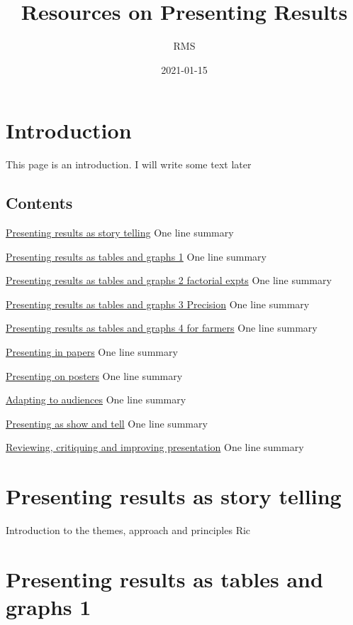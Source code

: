 \documentclass[
]{book}
\title{Resources on Presenting Results}
\author{RMS}
\date{2021-01-15}
\begin{document}
\maketitle

{
\setcounter{tocdepth}{1}
\tableofcontents
}
\hypertarget{introduction}{%
\chapter{Introduction}\label{introduction}}

This page is an introduction. I will write some text later

\hypertarget{contents}{%
\section{Contents}\label{contents}}

\protect\hyperlink{story}{Presenting results as story telling}
One line summary

\protect\hyperlink{tablegraph1}{Presenting results as tables and graphs 1}
One line summary

\protect\hyperlink{factor}{Presenting results as tables and graphs 2 factorial expts}
One line summary

\protect\hyperlink{precision}{Presenting results as tables and graphs 3 Precision}
One line summary

\protect\hyperlink{farmers}{Presenting results as tables and graphs 4 for farmers}
One line summary

\protect\hyperlink{papers}{Presenting in papers}
One line summary

\protect\hyperlink{posters}{Presenting on posters}
One line summary

\protect\hyperlink{audience}{Adapting to audiences}
One line summary

\protect\hyperlink{showandtell}{Presenting as show and tell}
One line summary

\protect\hyperlink{review}{Reviewing, critiquing and improving presentation}
One line summary

\hypertarget{story}{%
\chapter{Presenting results as story telling}\label{story}}

Introduction to the themes, approach and principles
Ric

\hypertarget{tablegraph1}{%
\chapter{Presenting results as tables and graphs 1}\label{tablegraph1}}
\end{document}
